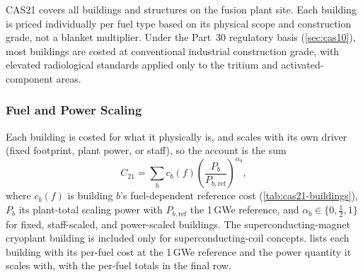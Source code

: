 \documentclass{article}
\begin{document}
CAS21 covers all buildings and structures on the fusion plant site.
Each building is priced individually per fuel type based on its
physical scope and construction grade, not a blanket multiplier.
Under the Part~30 regulatory basis (\cref{sec:cas10}), most buildings
are costed at conventional industrial construction grade, with elevated
radiological standards applied only to the tritium and
activated-component areas.

\subsubsection{Fuel and Power Scaling}
Each building is costed for what it physically is, and scales with its
own driver (fixed footprint, plant power, or staff), so the account is
the sum
\begin{equation}
\label{eq:cas21}
C_{21} = \sum_b c_b(f)
  \left(\frac{P_b}{P_{b,\text{ref}}}\right)^{\alpha_b},
\end{equation}
where $c_b(f)$ is building $b$'s fuel-dependent reference cost
(\cref{tab:cas21-buildings}), $P_b$ its plant-total scaling power with
$P_{b,\text{ref}}$ the 1\,GWe reference, and $\alpha_b \in \{0,
\tfrac{1}{2}, 1\}$ for fixed, staff-scaled, and power-scaled buildings.
The superconducting-magnet cryoplant building is included only for
superconducting-coil concepts.  lists each
building with its per-fuel cost at the 1\,GWe reference and the power
quantity it scales with, with the per-fuel totals in the final row.
\end{document}
